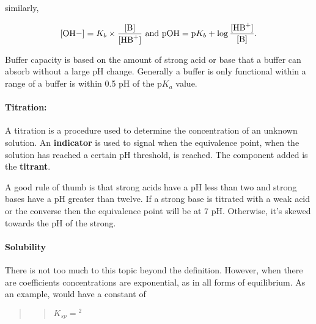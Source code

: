 \documentclass[]{article}
\let\oldparagraph\paragraph
\renewcommand{\paragraph}[1]{\oldparagraph{#1}\mbox{}}
\begin{document}
similarly,

\[\ce{\lbrack OH-\rbrack } = K_b\times \dfrac{\ce{\lbrack B\rbrack }}{\ce{\lbrack HB+\rbrack }}\text{ and } \text{pOH}=\text{p}K_b + \log{\dfrac{\ce{\lbrack HB+\rbrack }}{\ce{\lbrack B\rbrack }}}.\]

Buffer capacity is based on the amount of strong acid or base that a
buffer can absorb without a large pH change. Generally a buffer is only
functional within a range of a buffer is within 0.5 pH of the p\(K_a\)
value.

\paragraph{Titration:}\label{titration}

A titration is a procedure used to determine the concentration of an
unknown solution. An \textbf{indicator} is used to signal when the
equivalence point, when the solution has reached a certain pH threshold,
is reached. The component added is the \textbf{titrant}.

A good rule of thumb is that strong acids have a pH less than two and
strong bases have a pH greater than twelve. If a strong base is titrated
with a weak acid or the converse then the equivalence point will be at 7
pH. Otherwise, it's skewed towards the pH of the strong.

\paragraph{Solubility}\label{solubility}

There is not too much to this topic beyond the definition. However, when
there are coefficients concentrations are exponential, as in all forms
of equilibrium. As an example,  would have a constant of

\begin{quote}
\begin{quote}
\(K_{sp} =\)\lbrack {}\rbrack \lbrack {}\rbrack \(^2\)
\end{quote}
\end{quote}
\end{document}
